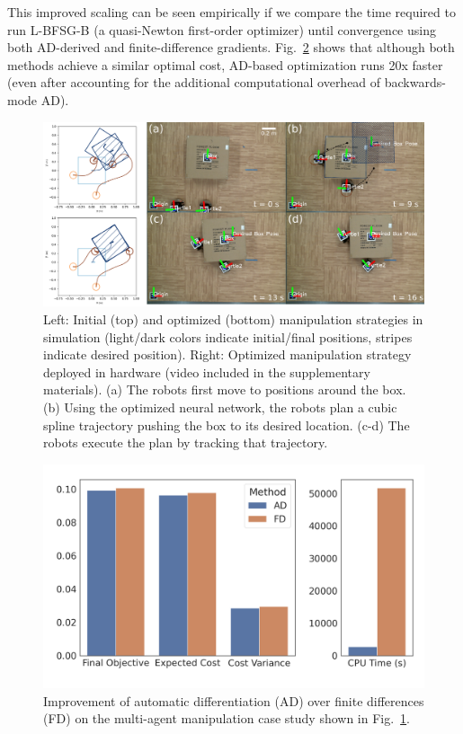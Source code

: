 This improved scaling can be seen empirically if we compare the time required to run L-BFSG-B (a quasi-Newton first-order optimizer) until convergence using both AD-derived and finite-difference gradients. Fig.~\ref{local:fig:ablation} shows that although both methods achieve a similar optimal cost, AD-based optimization runs 20x faster (even after accounting for the additional computational overhead of backwards-mode AD).

\begin{figure}[tb]
    \centering
    \includegraphics[width=\linewidth]{images/local_methods/mam_composite_w_sim.png}
    \caption{Left: Initial (top) and optimized (bottom) manipulation strategies in simulation (light/dark colors indicate initial/final positions, stripes indicate desired position). Right: Optimized manipulation strategy deployed in hardware (video included in the supplementary materials). (a) The robots first move to positions around the box. (b) Using the optimized neural network, the robots plan a cubic spline trajectory pushing the box to its desired location. (c-d) The robots execute the plan by tracking that trajectory.}
    \label{local:fig:mam_hw}
\end{figure}

\begin{figure}[t]
    \centering
    \includegraphics[width=0.7\linewidth]{images/local_methods/mam_ablation_ad_fd.png}
    \caption{Improvement of automatic differentiation (AD) over finite differences (FD) on the multi-agent manipulation case study shown in Fig.~\ref{local:fig:mam_hw}.}
    \label{local:fig:ablation}
\end{figure}

